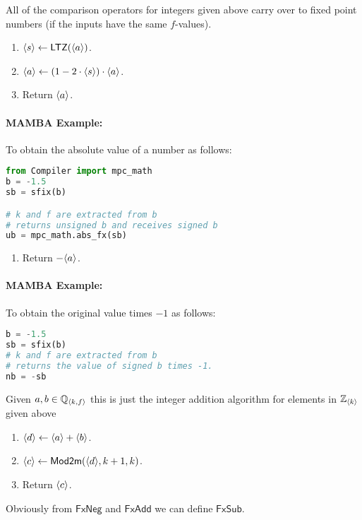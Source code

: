 All of the comparison operators for integers given above carry
over to fixed point numbers (if the inputs have the same $f$-values).

\begin{enumerate}
\item $\langle s \rangle \leftarrow \mathsf{LTZ}(\langle a \rangle)$.
\item $\langle a \rangle \leftarrow (1-2\cdot \langle s \rangle) \cdot \langle a \rangle$.
\item Return $\langle a \rangle$.
\end{enumerate}

\paragraph{MAMBA Example:} To obtain the absolute value of a number as follows: 
\begin{lstlisting}[language={python}]
from Compiler import mpc_math
b = -1.5
sb = sfix(b)

# k and f are extracted from b
# returns unsigned b and receives signed b
ub = mpc_math.abs_fx(sb)
\end{lstlisting}

\begin{enumerate}
\item Return $-\langle a \rangle$.
\end{enumerate}
\paragraph{MAMBA Example:} To obtain the original value times $-1$ as follows: 
\begin{lstlisting}[language={python}]
b = -1.5
sb = sfix(b)
# k and f are extracted from b
# returns the value of signed b times -1.
nb = -sb
\end{lstlisting}
Given $a, b \in {\mathbb{Q}}_{\langle k, f \rangle}$ this is just the integer addition algorithm for elements
in ${\mathbb{Z}}_{\langle k \rangle}$ given above
\begin{enumerate}
\item $\langle d \rangle \leftarrow \langle a \rangle + \langle b \rangle$.
\item $\langle c \rangle \leftarrow \mathsf{Mod2m}(\langle d \rangle,k+1,k)$.
\item Return $\langle c \rangle$.
\end{enumerate}
Obviously from $\mathsf{FxNeg}$ and $\mathsf{FxAdd}$ we can define $\mathsf{FxSub}$.
